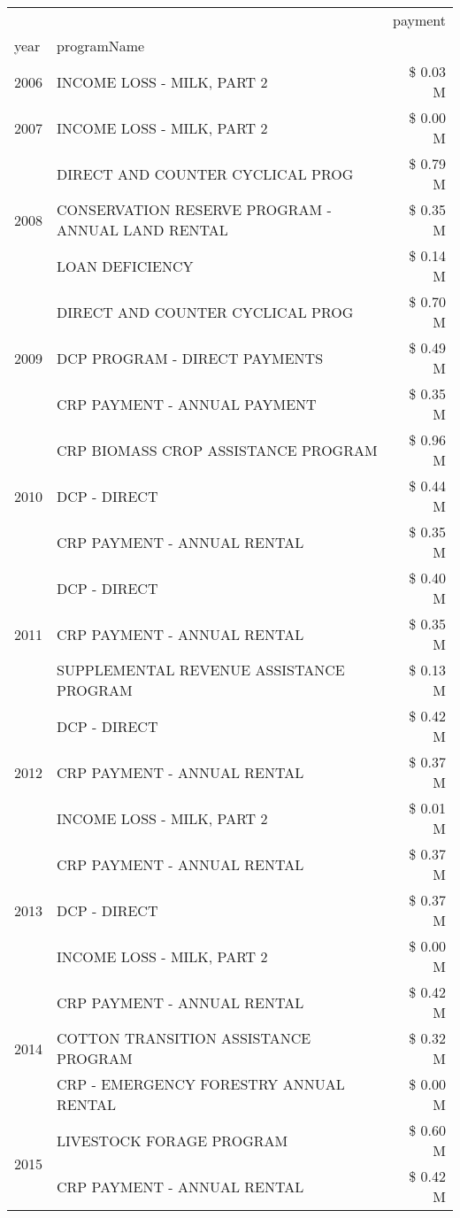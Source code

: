 \begin{tabular}{llr}
\toprule
 &  & payment \\
year & programName &  \\
\midrule
2006 & INCOME LOSS - MILK, PART 2 & \$ 0.03 M \\
\cline{1-3}
2007 & INCOME LOSS - MILK, PART 2 & \$ 0.00 M \\
\cline{1-3}
\multirow[t]{3}{*}{2008} & DIRECT AND COUNTER CYCLICAL PROG & \$ 0.79 M \\
 & CONSERVATION RESERVE PROGRAM - ANNUAL LAND RENTAL & \$ 0.35 M \\
 & LOAN DEFICIENCY & \$ 0.14 M \\
\cline{1-3}
\multirow[t]{3}{*}{2009} & DIRECT AND COUNTER CYCLICAL PROG & \$ 0.70 M \\
 & DCP PROGRAM - DIRECT PAYMENTS & \$ 0.49 M \\
 & CRP PAYMENT - ANNUAL PAYMENT & \$ 0.35 M \\
\cline{1-3}
\multirow[t]{3}{*}{2010} & CRP BIOMASS CROP ASSISTANCE PROGRAM & \$ 0.96 M \\
 & DCP - DIRECT & \$ 0.44 M \\
 & CRP PAYMENT - ANNUAL RENTAL & \$ 0.35 M \\
\cline{1-3}
\multirow[t]{3}{*}{2011} & DCP - DIRECT & \$ 0.40 M \\
 & CRP PAYMENT - ANNUAL RENTAL & \$ 0.35 M \\
 & SUPPLEMENTAL REVENUE ASSISTANCE PROGRAM & \$ 0.13 M \\
\cline{1-3}
\multirow[t]{3}{*}{2012} & DCP - DIRECT & \$ 0.42 M \\
 & CRP PAYMENT - ANNUAL RENTAL & \$ 0.37 M \\
 & INCOME LOSS - MILK, PART 2 & \$ 0.01 M \\
\cline{1-3}
\multirow[t]{3}{*}{2013} & CRP PAYMENT - ANNUAL RENTAL & \$ 0.37 M \\
 & DCP - DIRECT & \$ 0.37 M \\
 & INCOME LOSS - MILK, PART 2 & \$ 0.00 M \\
\cline{1-3}
\multirow[t]{3}{*}{2014} & CRP PAYMENT - ANNUAL RENTAL & \$ 0.42 M \\
 & COTTON TRANSITION ASSISTANCE PROGRAM & \$ 0.32 M \\
 & CRP - EMERGENCY FORESTRY ANNUAL RENTAL & \$ 0.00 M \\
\cline{1-3}
\multirow[t]{3}{*}{2015} & LIVESTOCK FORAGE PROGRAM & \$ 0.60 M \\
 & CRP PAYMENT - ANNUAL RENTAL & \$ 0.42 M \\

\end{tabular}
